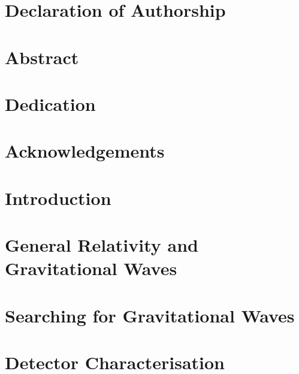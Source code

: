 \documentclass[12pt,twoside]{report} %
\begin{document}


\chapter*{Declaration of Authorship}


\chapter*{Abstract}


\chapter*{Dedication}


\chapter*{Acknowledgements}


\tableofcontents

\listoffigures

\listoftables

\chapter*{Introduction}


\chapter{General Relativity and Gravitational Waves}


\chapter{Searching for Gravitational Waves}


\chapter{Detector Characterisation}

\end{document}
